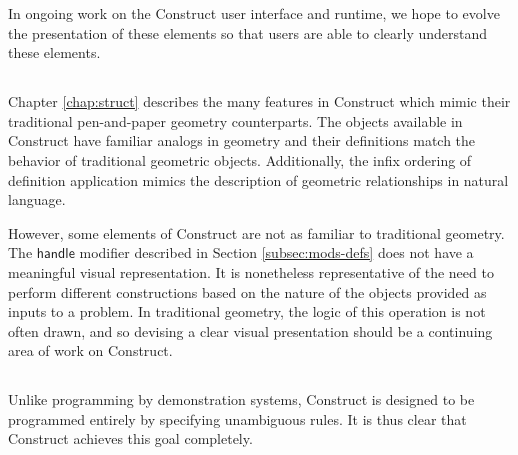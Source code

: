 \documentclass[twoside,openright,11pt]{report}
\begin{document}
In ongoing work on the Construct user interface and runtime, we hope to evolve the presentation of these elements so that users are able to clearly understand these elements.

\subsection{\constructgoalsnative}

Chapter \ref{chap:struct} describes the many features in Construct which mimic their traditional pen-and-paper geometry counterparts.
The objects available in Construct have familiar analogs in geometry and their definitions match the behavior of traditional geometric objects. 
Additionally, the infix ordering of definition application mimics the description of geometric relationships in natural language.

However, some elements of Construct are not as familiar to traditional geometry. 
The $\mathsf{handle}$ modifier described in Section \ref{subsec:mods-defs} does not have a meaningful visual representation.
It is nonetheless representative of the need to perform different constructions based on the nature of the objects provided as inputs to a problem. 
In traditional geometry, the logic of this operation is not often drawn, and so devising a clear visual presentation should be a continuing area of work on Construct.

\subsection{\constructgoalsnoinfer}

Unlike programming by demonstration systems, Construct is designed to be programmed entirely by specifying unambiguous rules.
It is thus clear that Construct achieves this goal completely.

\subsection{\constructgoalscomplete}

\appendix

\nocite{*}



\end{document}
